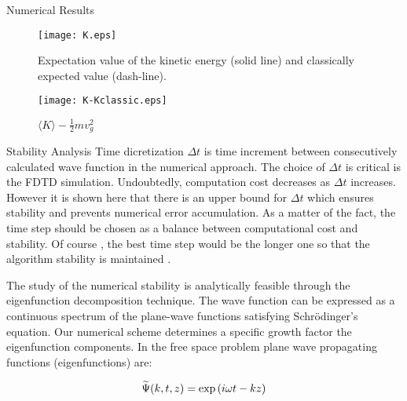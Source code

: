 \begin{homeworkProblem}
\begin{homeworkSection}{Numerical Results}
\begin{figure}[!h]
\centering
\texttt{[image: K.eps]}
\caption{\small  Expectation value of the kinetic energy (solid line) and classically expected value (dash-line). }
\label{fig-KK}
\end{figure} 
\begin{figure}[!h]
\centering
\texttt{[image: K-Kclassic.eps]}
\caption{\small  $\langle K\rangle -\frac{1}{2}mv_g^2$  }
\label{fig:K-Kclassic}
\end{figure} 





\end{homeworkSection}


\begin{homeworkSection}{Stability Analysis}
Time dicretization $\Delta t$ is time increment between consecutively calculated wave function in the numerical approach. The choice of $\Delta t$ is critical is the FDTD simulation. Undoubtedly, computation cost decreases as $\Delta t$ increases. However it is shown here that there is an upper bound for $\Delta t$ which ensures stability and prevents numerical error accumulation. As a matter of the fact, the time step should be chosen as a balance between computational cost and stability. Of course , the best time step would be the longer one so that the algorithm stability is maintained \cite{taflove}. 

The study of the numerical stability is analytically feasible through the eigenfunction decomposition technique. The wave function can be expressed as a continuous spectrum of the plane-wave functions satisfying Schr\"odinger's equation. Our numerical scheme determines a specific growth factor the eigenfunction components. In the free space problem  plane wave propagating functions (eigenfunctions) are:


\begin{equation}
\widetilde{\Psi}(k,t,z)=\exp\left(i\omega t-kz\right)
\end{equation}     


\end{homeworkSection}
\end{homeworkProblem}
